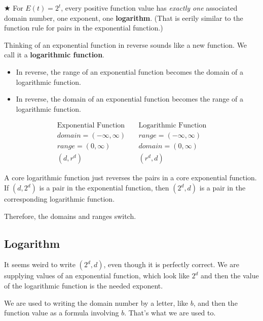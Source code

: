 \documentclass{ximera}
\begin{document}
\textbf{\textcolor{red!70!darkgray}{$\bigstar$}} For $E(t) = 2^t$, every positive function value has \textit{exactly one} associated domain number, one exponent, one \textbf{\textcolor{purple!85!blue}{logarithm}}. (That is eerily similar to the function rule for pairs in the exponential function.) 




Thinking of an exponential function in reverse sounds like a new function. We call it a \textbf{\textcolor{purple!85!blue}{logarithmic function}}.   


\begin{itemize}
\item In reverse, the range of an exponential function becomes the domain of a logarithmic function.
\item In reverse, the domain of an exponential function becomes the range of a logarithmic function.
\end{itemize}





\[
\begin{array}{lcl}
\text{Exponential Function}  &     &  \text{Logarithmic Function}  \\
domain = (-\infty, \infty)  &  \   &  range = (-\infty, \infty)  \\
range = (0, \infty)  &    &  domain = (0, \infty)  \\
(d, r^d)    &    &   (r^d, d)
\end{array}
\]


A core logarithmic function just reverses the pairs in a core exponential function.  If $(d, 2^d)$ is a pair in the exponential function, then $(2^d, d)$ is a pair in the corresponding logarithmic function.


Therefore, the domains and ranges switch. 






\subsection*{Logarithm}

It seems weird to write $(2^d, d)$, even though it is perfectly correct.  We are supplying values of an exponential function, which look like $2^d$ and then the value of the logarithmic function is the needed exponent.

We are used to writing the domain number by a letter, like $b$, and then the function value as a formula involving $b$. That's what we are used to.
\end{document}
